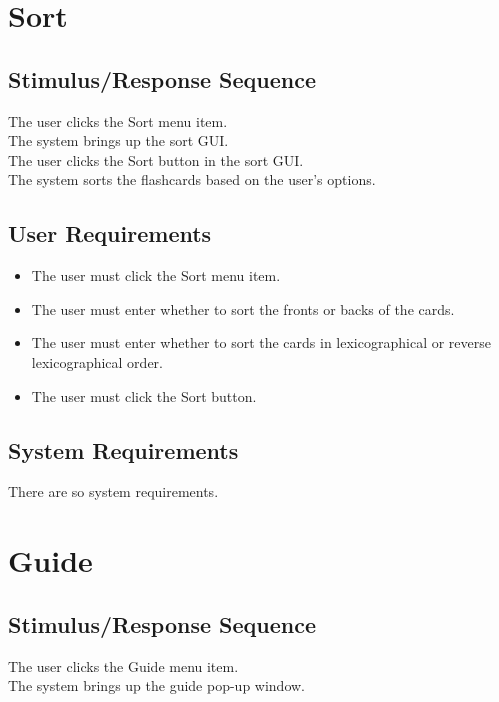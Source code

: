 \documentclass{scrreprt}
\newcommand{\smallspace}{\vspace{0.5cm}}
\begin{document}
\section{Sort}
    \subsection*{Stimulus/Response Sequence}
        \begin{flushleft}
             The user clicks the Sort menu item. \\
             The system brings up the sort GUI. \\
            \smallspace
             The user clicks the Sort button in the sort GUI. \\
             The system sorts the flashcards based on the user's options. \\
        \end{flushleft}
    \subsection*{User Requirements}
        \begin{itemize}
            \item The user must click the Sort menu item.
            \item The user must enter whether to sort the fronts or backs of the cards.
            \item The user must enter whether to sort the cards in lexicographical or reverse lexicographical order.
            \item The user must click the Sort button.
        \end{itemize} 

    \subsection*{System Requirements}
        There are so system requirements. 

\section{Guide}
    \subsection*{Stimulus/Response Sequence}
        \begin{flushleft}
             The user clicks the Guide menu item. \\
             The system brings up the guide pop-up window. \\
        \end{flushleft}
\end{document}

